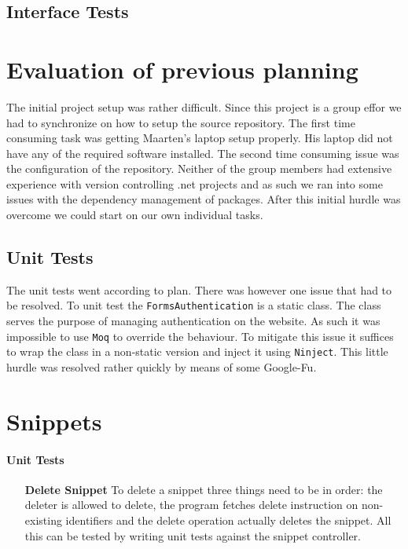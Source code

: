 \documentclass[10pt,a4paper,BCOR12mm, headexclude, footexclude,
  twoside, openright]{scrartcl}
\numberwithin{equation}{section} %
\numberwithin{figure}{section} %
\numberwithin{table}{section} %
\begin{document}
\subsection{Interface Tests}

\section{Evaluation of previous planning}
The initial project setup was rather difficult. Since this project is a group
effor we had to synchronize on how to setup the source repository. The first
time consuming task was getting Maarten's laptop setup properly. His laptop did
not have any of the required software installed. The second time consuming issue
was the configuration of the repository. Neither of the group members had
extensive experience with version controlling .net projects and as such we ran
into some issues with the dependency management of packages. After this initial
hurdle was overcome we could start on our own individual tasks.

\subsection{Unit Tests}
The unit tests went according to plan. There was however one issue that had to
be resolved. To unit test the \texttt{FormsAuthentication} is a static
class. The class serves the purpose of managing authentication on the
website. As such it was impossible to use \texttt{Moq} to override the
behaviour. To mitigate this issue it suffices to wrap the class in a non-static
version and inject it using \texttt{Ninject}. This little hurdle was resolved
rather quickly by means of some Google-Fu.


\section{Snippets}
\paragraph{Unit Tests}

\begin{itemize}

\item[\textbf{Delete Snippet}] To delete a snippet three things need to be in
  order: the deleter is allowed to delete, the program fetches delete
  instruction on non-existing identifiers and the delete operation actually
  deletes the snippet. All this can be tested by writing unit tests against the
  snippet controller.
\end{itemize}
\end{document}
